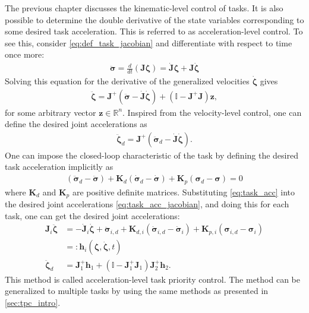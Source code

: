 The previous chapter discusses the kinematic-level control of tasks. It is also 
possible to determine the double derivative of the state variables corresponding to some
desired task acceleration. This is referred to as acceleration-level control.
To see this, consider \autoref{eq:def_task_jacobian} and differentiate
with respect to time once more:
\begin{align}
    \ddot{\bm{\sigma}} = \frac{d}{dt}\left(\bm{J} \bm{\zeta}\right) = \dot{\bm{J}} \bm{\zeta} + \bm{J} \dot{\bm{\zeta}}
    \label{eq:task_acc_jacobian}
\end{align}
Solving this equation for the derivative of the generalized velocities \(\dot{\bm{\zeta}}\) gives
\begin{align}
    \ddot{\bm{\zeta}} = \bm{J}^{+} \left(\ddot{\bm{\sigma}} - \dot{\bm{J}}\dot{\bm{\zeta}}\right) +
    \left(\mathbb{I} - \bm{J}^{+}\bm{J}\right) \bm{z} \label{eq:task_acc_control},
\end{align}
for some arbitrary vector $\bm{z} \in \mathbb{R}^n$. Inspired from the
velocity-level control, one can define the desired joint accelerations as
\begin{align}
    \ddot{\bm{\zeta}}_d = \bm{J}^{+} \left(\ddot{\bm{\sigma}}_d
    - \dot{\bm{J}}\dot{\bm{\zeta}}\right) \label{eq:task_priority_acc}.
\end{align}
One can impose the closed-loop characteristic of the task by defining the desired
task acceleration implicitly as
\begin{align}
    \left(\ddot{\bm{\sigma}}_d - \ddot{\bm{\sigma}}\right) +
    \bm{K}_d\left(\dot{\bm{\sigma}}_d - \dot{\bm{\sigma}}\right) +
    \bm{K}_p\left(\bm{\sigma}_d - \bm{\sigma}\right) = 0 \label{eq:task_acc}
\end{align}
where $\bm{K}_d$ and $\bm{K}_p$ are positive definite matrices. Substituting
\autoref{eq:task_acc} into the desired joint accelerations \autoref{eq:task_acc_jacobian},
and doing this for each task, one can get the desired joint accelerations:
\begin{subequations}
\begin{align}
    \bm{J}_i\ddot{\bm{\zeta}} &= -\dot{\bm{J}}_i\dot{\bm{\zeta}} + \ddot{\bm{\sigma}}_{i,d} 
    + \bm{K}_{d,i}\left(\dot{\bm{\sigma}}_{i,d} - \dot{\bm{\sigma}}_i\right)
    + \bm{K}_{p,i}\left(\bm{\sigma}_{i,d} - \bm{\sigma}_i\right) \\
    &=: \bm{h}_i(\bm{\zeta}, \dot{\bm{\zeta}}, t) \\
    \ddot{\bm{\zeta}}_d &= \bm{J}_1^{+} \bm{h}_1 + \left(\mathbb{I} - \bm{J}_1^+\bm{J}_1\right) \bm{J}_2^{+} \bm{h}_2.
\end{align}
\end{subequations}
This method is called acceleration-level task priority control. The method can
be generalized to multiple tasks by using the same methods as presented in \autoref{sec:tpc_intro}.


